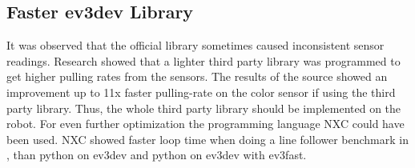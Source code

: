 \documentclass[../report.tex]{subfiles}
\begin{document}
\subsection*{Faster ev3dev Library}
It was observed that the official library \cite{ev3dev_lang_python} sometimes caused inconsistent sensor readings. Research showed that a lighter third party library \cite{ev3dev_fast_python} was programmed to get higher pulling rates from the sensors. The results of the source \cite{ev3dev_fast_python_test} showed an improvement up to 11x faster pulling-rate on the color sensor if using the third party library. Thus, the whole third party library should be implemented on the robot. For even further optimization the programming language NXC \cite{nxc} could have been used. NXC showed faster loop time when doing a line follower benchmark in \cite{ev3dev_fast_python}, than python on ev3dev and python on ev3dev with ev3fast.
\end{document}
